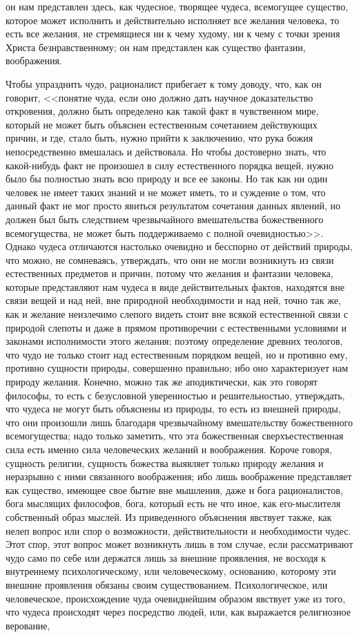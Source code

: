 \documentclass[12pt]{article}
\begin{document}
он нам представлен здесь, как чудесное, творящее чудеса, всемогущее существо, которое может исполнить и действительно исполняет все желания человека, то есть все желания, не стремящиеся ни к чему худому, ни к чему с точки зрения Христа безнравственному; он нам представлен как существо фантазии, воображения. 

Чтобы упразднить чудо, рационалист прибегает к тому доводу, что, как он говорит, <<понятие чуда, если оно должно дать научное доказательство откровения, должно быть определено как такой факт в чувственном мире, который не может быть объяснен естественным сочетанием действующих причин, и где, стало быть, нужно прийти к заключению, что рука божия непосредственно вмешалась и действовала. Но чтобы достоверно знать, что какой-нибудь факт не произошел в силу естественного порядка вещей, нужно было бы полностью знать всю природу и все ее законы. Но так как ни один человек не имеет таких знаний и не может иметь, то и суждение о том, что данный факт не мог просто явиться результатом сочетания данных явлений, но должен был быть следствием чрезвычайного вмешательства божественного всемогущества, не может быть поддерживаемо с полной очевидностью>>. Однако чудеса отличаются настолько очевидно и бесспорно от действий природы, что можно, не сомневаясь, утверждать, что они не могли возникнуть из связи естественных предметов и причин, потому что желания и фантазии человека, которые представляют нам чудеса в виде действительных фактов, находятся вне связи вещей и над ней, вне природной необходимости и над ней, точно так же, как и желание неизлечимо слепого видеть стоит вне всякой естественной связи с природой слепоты и даже в прямом противоречии с естественными условиями и законами исполнимости этого желания; поэтому определение древних теологов, что чудо не только стоит над естественным порядком вещей, но и противно ему, противно сущности природы, совершенно правильно; ибо оно характеризует нам природу желания. Конечно, можно так же аподиктически, как это говорят философы, то есть с безусловной уверенностью и решительностью, утверждать, что чудеса не могут быть объяснены из природы, то есть из внешней природы, что они произошли лишь благодаря чрезвычайному вмешательству божественного всемогущества; надо только заметить, что эта божественная сверхъестественная сила есть именно сила человеческих желаний и воображения. Короче говоря, сущность религии, сущность божества выявляет только природу желания и неразрывно с ними связанного воображения; ибо лишь воображение представляет как существо, имеющее свое бытие вне мышления, даже и бога рационалистов, бога мыслящих философов, бога, который есть не что иное, как его-мыслителя собственный образ мыслей. Из приведенного объяснения явствует также, как нелеп вопрос или спор о возможности, действительности и необходимости чудес. Этот спор, этот вопрос может возникнуть лишь в том случае, если рассматривают чудо само по себе или держатся лишь за внешние проявления, не восходя к внутреннему психологическому, или человеческому, основанию, которому эти внешние проявления обязаны своим существованием. Психологическое, или человеческое, происхождение чуда очевиднейшим образом явствует уже из того, что чудеса происходят через посредство людей, или, как выражается религиозное верование, 
\end{document}
